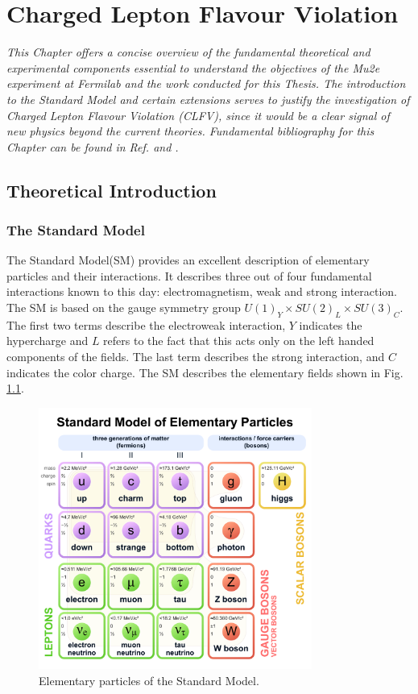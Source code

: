 \chapter{Charged Lepton Flavour Violation}
\textit{This Chapter offers a concise overview of the fundamental 
theoretical and experimental components essential to understand the objectives 
of the Mu2e experiment at Fermilab and the work conducted for this 
Thesis. The introduction to the Standard Model and certain extensions serves to 
justify the investigation of Charged Lepton Flavour Violation (CLFV), 
since it would be a clear signal of new physics beyond the current theories. 
Fundamental bibliography for this Chapter can be found in Ref. \cite{Bernstein_2013} and \cite{clfv_signorelli}.}
\section{Theoretical Introduction}
\subsection{The Standard Model}
The Standard Model(SM) provides an excellent description of elementary particles and their interactions.
It describes three out of 
four fundamental interactions known to this day: electromagnetism, weak and strong interaction.
The SM is 
based on the gauge symmetry group $U(1)_Y \times SU(2)_L \times SU(3)_C$. The 
first two terms describe the electroweak interaction, $Y$ indicates 
the hypercharge and $L$ refers to the fact that this acts only on the left handed components of the fields.
The last term describes the strong interaction, and $C$ indicates the color charge.
The SM describes the elementary fields shown in Fig. \ref{fig:sm}.

\begin{figure}[!h]
\centering
\includegraphics[width =0.8\textwidth]{figures/pdf/Standard_Model_of_Elementary_Particles.pdf}
\caption[Elementary particles of the Standard Model.]{Elementary particles of the Standard Model.}
\label{fig:sm}
\end{figure}


